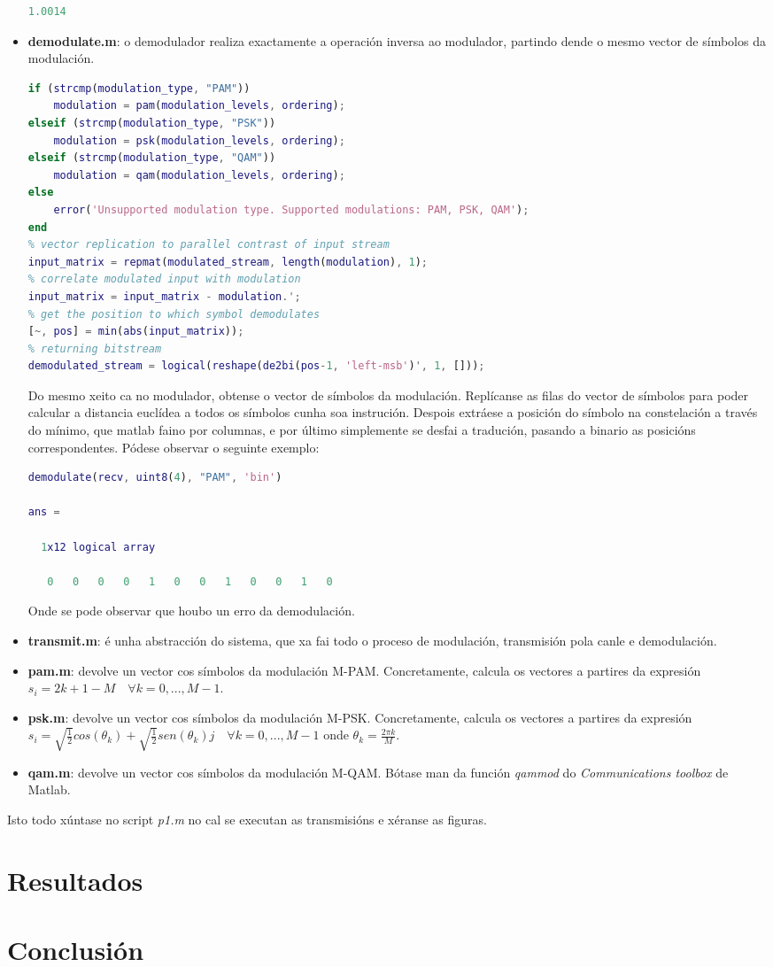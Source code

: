 \documentclass[
	10pt, %
	spanish, %
]{fphw}
\begin{document}
\begin{itemize}
\begin{lstlisting}[language=matlab]
    1.0014
\end{lstlisting}
\item \textbf{demodulate.m}: o demodulador realiza exactamente a operación inversa ao modulador, partindo dende o mesmo vector de símbolos da modulación.
\begin{lstlisting}[language=matlab]
% modulation type checking and modulation computation
if (strcmp(modulation_type, "PAM"))
	modulation = pam(modulation_levels, ordering);
elseif (strcmp(modulation_type, "PSK"))
	modulation = psk(modulation_levels, ordering);
elseif (strcmp(modulation_type, "QAM"))
	modulation = qam(modulation_levels, ordering);
else
	error('Unsupported modulation type. Supported modulations: PAM, PSK, QAM');
end
% vector replication to parallel contrast of input stream
input_matrix = repmat(modulated_stream, length(modulation), 1);
% correlate modulated input with modulation
input_matrix = input_matrix - modulation.';
% get the position to which symbol demodulates
[~, pos] = min(abs(input_matrix));
% returning bitstream
demodulated_stream = logical(reshape(de2bi(pos-1, 'left-msb')', 1, []));
\end{lstlisting}
Do mesmo xeito ca no modulador, obtense o vector de símbolos da modulación. Replícanse as filas do vector de símbolos para poder calcular a distancia euclídea a todos os símbolos cunha soa instrución. Despois extráese a posición do símbolo na constelación a través do mínimo, que matlab faino por columnas, e por último simplemente se desfai a tradución, pasando a binario as posicións correspondentes. Pódese observar o seguinte exemplo:
\begin{lstlisting}[language=matlab]
demodulate(recv, uint8(4), "PAM", 'bin')

ans =

  1x12 logical array

   0   0   0   0   1   0   0   1   0   0   1   0
\end{lstlisting}
Onde se pode observar que houbo un erro da demodulación.
\item \textbf{transmit.m}: é unha abstracción do sistema, que xa fai todo o proceso de modulación, transmisión pola canle e demodulación.
\item \textbf{pam.m}: devolve un vector cos símbolos da modulación M-PAM. Concretamente, calcula os vectores a partires da expresión $s_i = 2k + 1 - M \quad \forall k = 0, ..., M-1$.
\item \textbf{psk.m}: devolve un vector cos símbolos da modulación M-PSK. Concretamente, calcula os vectores a partires da expresión $s_i = \sqrt{\frac{1}{2}} cos(\theta_k) + \sqrt{\frac{1}{2}} sen(\theta_k)j \quad \forall k = 0,...,M-1$ onde $\theta_k = \frac{2\pi k}{M}$.
\item \textbf{qam.m}: devolve un vector cos símbolos da modulación M-QAM. Bótase man da función \textit{qammod} do \textit{Communications toolbox} de Matlab. 
\end{itemize}
Isto todo xúntase no script \textit{p1.m} no cal se executan as transmisións e xéranse as figuras.
\section*{Resultados}
\section*{Conclusión}
\end{document}
